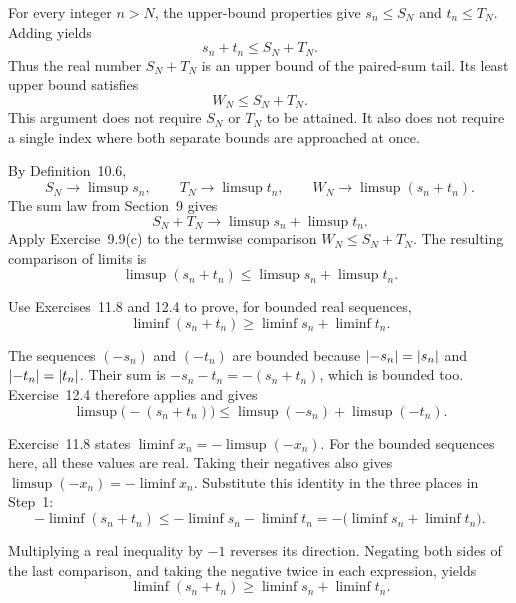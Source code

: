 For every integer $n>N$, the upper-bound properties give
$s_n\le S_N$ and $t_n\le T_N$. Adding yields
\[
 s_n+t_n\le S_N+T_N.
\]
Thus the real number $S_N+T_N$ is an upper bound of the paired-sum
tail. Its least upper bound satisfies
\[
 W_N\le S_N+T_N.
\]
This argument does not require $S_N$ or $T_N$ to be attained. It
also does not require a single index where both separate bounds
are approached at once.

By Definition~10.6,
\[
 S_N\to\limsup s_n,\qquad T_N\to\limsup t_n,
 \qquad W_N\to\limsup(s_n+t_n).
\]
The sum law from Section~9 gives
\[
 S_N+T_N\longrightarrow\limsup s_n+\limsup t_n.
\]
Apply Exercise~9.9(c) to the termwise comparison $W_N\le S_N+T_N$.
The resulting comparison of limits is
\[
 \limsup(s_n+t_n)\le\limsup s_n+\limsup t_n.
\]



\goal Use Exercises~11.8 and 12.4 to prove, for bounded real
sequences,
\[
 \liminf(s_n+t_n)\ge\liminf s_n+\liminf t_n.
\]

The sequences $(-s_n)$ and $(-t_n)$ are bounded because
$\left|-s_n\right|=\left|s_n\right|$ and $\left|-t_n\right|=\left|t_n\right|$.
Their sum is $-s_n-t_n=-(s_n+t_n)$, which is bounded too.
Exercise~12.4 therefore applies and gives
\[
 \limsup\bigl(-(s_n+t_n)\bigr)
    \le\limsup(-s_n)+\limsup(-t_n).
\]

Exercise~11.8 states
$\liminf x_n=-\limsup(-x_n)$.
For the bounded sequences here, all these values are real. Taking
their negatives also gives
$\limsup(-x_n)=-\liminf x_n$. Substitute this identity in the
three places in Step~1:
\[
 -\liminf(s_n+t_n)
    \le-\liminf s_n-\liminf t_n
    =-\bigl(\liminf s_n+\liminf t_n\bigr).
\]

Multiplying a real inequality by $-1$ reverses its direction.
Negating both sides of the last comparison, and taking the negative
twice in each expression, yields
\[
 \liminf(s_n+t_n)\ge\liminf s_n+\liminf t_n.
\]

